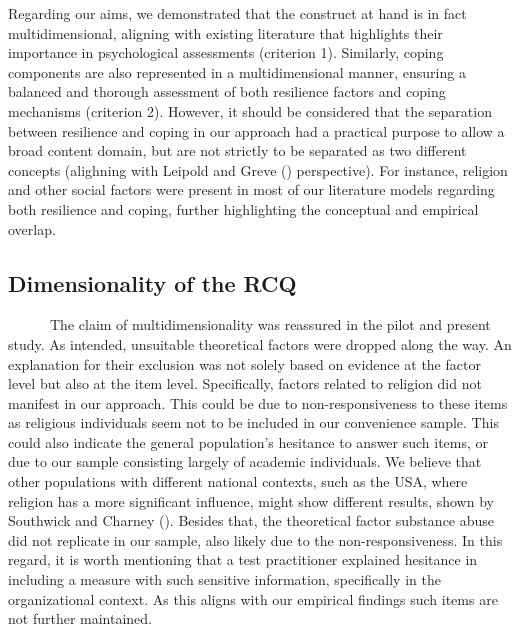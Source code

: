 \documentclass[
  man,floatsintext]{apa7}
\begin{document}
Regarding our aims, we demonstrated that the construct at hand is in fact multidimensional, aligning with existing literature that highlights their importance in psychological assessments (criterion 1). Similarly, coping components are also represented in a multidimensional manner, ensuring a balanced and thorough assessment of both resilience factors and coping mechanisms (criterion 2). However, it should be considered that the separation between resilience and coping in our approach had a practical purpose to allow a broad content domain, but are not strictly to be separated as two different concepts (alighning with Leipold and Greve () perspective). For instance, religion and other social factors were present in most of our literature models regarding both resilience and coping, further highlighting the conceptual and empirical overlap.

\subsection{Dimensionality of the RCQ}\label{dimensionality-of-the-rcq}

~~~~~~The claim of multidimensionality was reassured in the pilot and present study. As intended, unsuitable theoretical factors were dropped along the way. An explanation for their exclusion was not solely based on evidence at the factor level but also at the item level. Specifically, factors related to religion did not manifest in our approach. This could be due to non-responsiveness to these items as religious individuals seem not to be included in our convenience sample. This could also indicate the general population's hesitance to answer such items, or due to our sample consisting largely of academic individuals. We believe that other populations with different national contexts, such as the USA, where religion has a more significant influence, might show different results, shown by Southwick and Charney (). Besides that, the theoretical factor substance abuse did not replicate in our sample, also likely due to the non-responsiveness. In this regard, it is worth mentioning that a test practitioner explained hesitance in including a measure with such sensitive information, specifically in the organizational context. As this aligns with our empirical findings such items are not further maintained.
\end{document}
